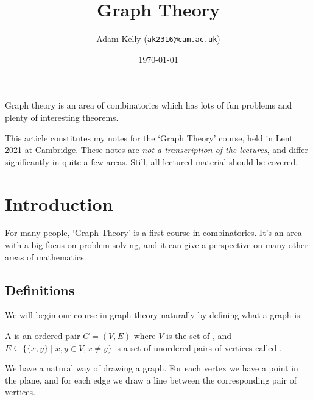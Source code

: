 \documentclass[a4paper]{scrartcl}
\title{Graph Theory}
\author{Adam Kelly (\texttt{ak2316@cam.ac.uk})}
\date{\today}
\begin{document}
\maketitle

Graph theory is an area of combinatorics which has lots of fun problems and plenty of interesting theorems.


This article constitutes my notes for the `Graph Theory' course, held in Lent 2021 at Cambridge. These notes are \emph{not a transcription of the lectures}, and differ significantly in quite a few areas. Still, all lectured material should be covered.


\tableofcontents





\section{Introduction}

For many people, `Graph Theory' is a first course in combinatorics. It's an area with a big focus on problem solving, and it can give a perspective on many other areas of mathematics.  

\subsection{Definitions}

We will begin our course in graph theory naturally by defining what a graph is.

\begin{definition}[Graph]
	A  is an ordered pair $G = (V, E)$ where $V$ is the set of , and $E \subseteq \{ \{x,y\} \mid x, y \in V, x \neq y \}$ is a set of unordered pairs of vertices called .
\end{definition}

We have a natural way of drawing a graph. For each vertex we have a point in the plane, and for each edge we draw a line between the corresponding pair of vertices.
\end{document}
